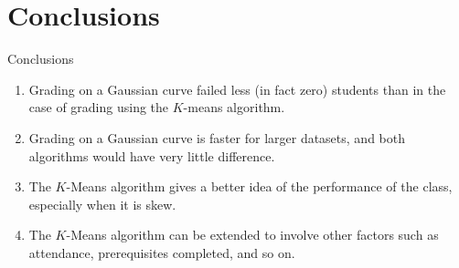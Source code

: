 \documentclass{beamer}
\theoremstyle{remark}
\begin{document}
\section{Conclusions}
\begin{frame}{Conclusions}
    \pause
    \begin{enumerate}
        \item Grading on a Gaussian curve failed less (in fact zero) students 
        than in the case of grading using the $K$-means algorithm.
        \pause
        \item Grading on a Gaussian curve is faster for larger datasets, and
        both algorithms would have very little difference.
        \pause
        \item The $K$-Means algorithm gives a better idea of the performance
        of the class, especially when it is skew.
        \pause
        \item The $K$-Means algorithm can be extended to involve other factors
        such as attendance, prerequisites completed, and so on.
    \end{enumerate}
\end{frame}
\end{document}
